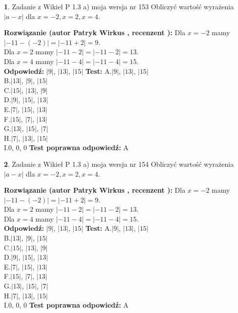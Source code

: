\documentclass[12pt, a4paper]{article}
\theoremstyle{definition} %
\newtheorem{zad}{}
\newcommand{\zadStart}[1]{\begin{zad}#1\newline}
\newcommand{\zadStop}{\end{zad}}
\newcommand{\rozwStart}[2]{\noindent \textbf{Rozwiązanie (autor #1 , recenzent #2): }\newline}
\newcommand{\rozwStop}{\newline}
\newcommand{\odpStart}{\noindent \textbf{Odpowiedź:}\newline}
\newcommand{\odpStop}{\newline}
\newcommand{\testStart}{\noindent \textbf{Test:}\newline}
\newcommand{\testStop}{\newline}
\newcommand{\kluczStart}{\noindent \textbf{Test poprawna odpowiedź:}\newline}
\newcommand{\kluczStop}{\newline}
\begin{document}
\zadStart{Zadanie z Wikieł P 1.3 a) moja wersja nr 153}
Obliczyć wartość wyrażenia $|a - x|$ dla $x=-2,x=2,x=4$.
\zadStop
\rozwStart{Patryk Wirkus}{}
Dla $x = -2$ mamy $|-11 - (-2)| = |-11 + 2| = 9$.\\
Dla $x = 2$ mamy $|-11 - 2| = |-11 - 2| = 13$.\\
Dla $x = 4$ mamy $|-11 - 4| = |-11 - 4| = 15$.\\
\rozwStop
\odpStart
$|9|$, $|13|$, $|15|$
\odpStop
\testStart
A.$|9|$, $|13|$, $|15|$\\
B.$|13|$, $|9|$, $|15|$\\
C.$|15|$, $|13|$, $|9|$\\
D.$|9|$, $|15|$, $|13|$\\
E.$|7|$, $|15|$, $|13|$\\
F.$|15|$, $|7|$, $|13|$\\
G.$|13|$, $|15|$, $|7|$\\
H.$|7|$, $|13|$, $|15|$\\
I.$0$, $0$, $0$
\testStop
\kluczStart
A
\kluczStop



\zadStart{Zadanie z Wikieł P 1.3 a) moja wersja nr 154}
Obliczyć wartość wyrażenia $|a - x|$ dla $x=-2,x=2,x=4$.
\zadStop
\rozwStart{Patryk Wirkus}{}
Dla $x = -2$ mamy $|-11 - (-2)| = |-11 + 2| = 9$.\\
Dla $x = 2$ mamy $|-11 - 2| = |-11 - 2| = 13$.\\
Dla $x = 4$ mamy $|-11 - 4| = |-11 - 4| = 15$.\\
\rozwStop
\odpStart
$|9|$, $|13|$, $|15|$
\odpStop
\testStart
A.$|9|$, $|13|$, $|15|$\\
B.$|13|$, $|9|$, $|15|$\\
C.$|15|$, $|13|$, $|9|$\\
D.$|9|$, $|15|$, $|13|$\\
E.$|7|$, $|15|$, $|13|$\\
F.$|15|$, $|7|$, $|13|$\\
G.$|13|$, $|15|$, $|7|$\\
H.$|7|$, $|13|$, $|15|$\\
I.$0$, $0$, $0$
\testStop
\kluczStart
A
\kluczStop
\end{document}
